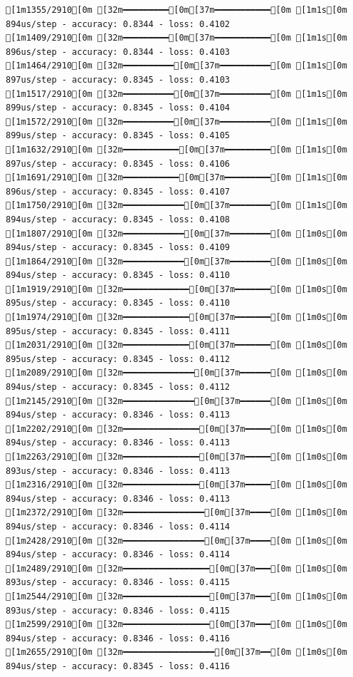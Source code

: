 \documentclass[
  letterpaper,
  DIV=11,
  numbers=noendperiod]{scrartcl}
\begin{document}
\begin{verbatim}
[1m1355/2910[0m [32m━━━━━━━━━[0m[37m━━━━━━━━━━━[0m [1m1s[0m 894us/step - accuracy: 0.8344 - loss: 0.4102
[1m1409/2910[0m [32m━━━━━━━━━[0m[37m━━━━━━━━━━━[0m [1m1s[0m 896us/step - accuracy: 0.8344 - loss: 0.4103
[1m1464/2910[0m [32m━━━━━━━━━━[0m[37m━━━━━━━━━━[0m [1m1s[0m 897us/step - accuracy: 0.8345 - loss: 0.4103
[1m1517/2910[0m [32m━━━━━━━━━━[0m[37m━━━━━━━━━━[0m [1m1s[0m 899us/step - accuracy: 0.8345 - loss: 0.4104
[1m1572/2910[0m [32m━━━━━━━━━━[0m[37m━━━━━━━━━━[0m [1m1s[0m 899us/step - accuracy: 0.8345 - loss: 0.4105
[1m1632/2910[0m [32m━━━━━━━━━━━[0m[37m━━━━━━━━━[0m [1m1s[0m 897us/step - accuracy: 0.8345 - loss: 0.4106
[1m1691/2910[0m [32m━━━━━━━━━━━[0m[37m━━━━━━━━━[0m [1m1s[0m 896us/step - accuracy: 0.8345 - loss: 0.4107
[1m1750/2910[0m [32m━━━━━━━━━━━━[0m[37m━━━━━━━━[0m [1m1s[0m 894us/step - accuracy: 0.8345 - loss: 0.4108
[1m1807/2910[0m [32m━━━━━━━━━━━━[0m[37m━━━━━━━━[0m [1m0s[0m 894us/step - accuracy: 0.8345 - loss: 0.4109
[1m1864/2910[0m [32m━━━━━━━━━━━━[0m[37m━━━━━━━━[0m [1m0s[0m 894us/step - accuracy: 0.8345 - loss: 0.4110
[1m1919/2910[0m [32m━━━━━━━━━━━━━[0m[37m━━━━━━━[0m [1m0s[0m 895us/step - accuracy: 0.8345 - loss: 0.4110
[1m1974/2910[0m [32m━━━━━━━━━━━━━[0m[37m━━━━━━━[0m [1m0s[0m 895us/step - accuracy: 0.8345 - loss: 0.4111
[1m2031/2910[0m [32m━━━━━━━━━━━━━[0m[37m━━━━━━━[0m [1m0s[0m 895us/step - accuracy: 0.8345 - loss: 0.4112
[1m2089/2910[0m [32m━━━━━━━━━━━━━━[0m[37m━━━━━━[0m [1m0s[0m 894us/step - accuracy: 0.8345 - loss: 0.4112
[1m2145/2910[0m [32m━━━━━━━━━━━━━━[0m[37m━━━━━━[0m [1m0s[0m 894us/step - accuracy: 0.8346 - loss: 0.4113
[1m2202/2910[0m [32m━━━━━━━━━━━━━━━[0m[37m━━━━━[0m [1m0s[0m 894us/step - accuracy: 0.8346 - loss: 0.4113
[1m2263/2910[0m [32m━━━━━━━━━━━━━━━[0m[37m━━━━━[0m [1m0s[0m 893us/step - accuracy: 0.8346 - loss: 0.4113
[1m2316/2910[0m [32m━━━━━━━━━━━━━━━[0m[37m━━━━━[0m [1m0s[0m 894us/step - accuracy: 0.8346 - loss: 0.4113
[1m2372/2910[0m [32m━━━━━━━━━━━━━━━━[0m[37m━━━━[0m [1m0s[0m 894us/step - accuracy: 0.8346 - loss: 0.4114
[1m2428/2910[0m [32m━━━━━━━━━━━━━━━━[0m[37m━━━━[0m [1m0s[0m 894us/step - accuracy: 0.8346 - loss: 0.4114
[1m2489/2910[0m [32m━━━━━━━━━━━━━━━━━[0m[37m━━━[0m [1m0s[0m 893us/step - accuracy: 0.8346 - loss: 0.4115
[1m2544/2910[0m [32m━━━━━━━━━━━━━━━━━[0m[37m━━━[0m [1m0s[0m 893us/step - accuracy: 0.8346 - loss: 0.4115
[1m2599/2910[0m [32m━━━━━━━━━━━━━━━━━[0m[37m━━━[0m [1m0s[0m 894us/step - accuracy: 0.8346 - loss: 0.4116
[1m2655/2910[0m [32m━━━━━━━━━━━━━━━━━━[0m[37m━━[0m [1m0s[0m 894us/step - accuracy: 0.8345 - loss: 0.4116

\end{verbatim}
\end{document}
